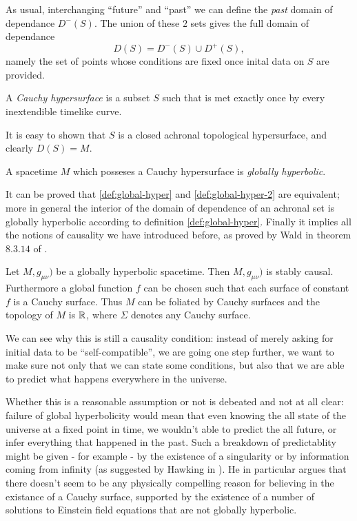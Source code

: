 As usual, interchanging ``future'' and ``past'' we can define the \emph{past} domain of dependance \(D^-(S)\). The union of these \(2\) sets gives the full domain of dependance 
\[
	D(S) = D^-(S) \cup D^+(S),
\]
namely the set of points whose conditions are fixed once inital data on \(S\) are provided.
\begin{definition}
	A \emph{Cauchy hypersurface} is a subset \(S\) such that is met exactly once by every inextendible timelike curve.
\end{definition}
It is easy to shown that \(S\) is a closed achronal topological hypersurface, and clearly \(D(S) = M\).
\begin{definition}
	\label{def:global-hyper-2}
	A spacetime \(M\) which posseses a Cauchy hypersurface is \emph{globally hyperbolic}.
\end{definition}
It can be proved that \ref{def:global-hyper} and \ref{def:global-hyper-2} are equivalent; more in general the interior of the domain of dependence of an achronal set is globally hyperbolic according to definition \ref{def:global-hyper}. Finally it implies all the notions of causality we have introduced before, as proved by Wald in theorem \(8.3.14\) of \cite{wald2010general} .
\begin{theorem}
	Let \(M,g_{\mu\nu})\) be a globally hyperbolic spacetime. Then \(M,g_{\mu\nu})\) is stably causal. Furthermore a global function \(f\) can be chosen such that each surface of constant \(f\) is a Cauchy surface. Thus \(M\) can be foliated by Cauchy surfaces and the topology of \(M\) is \(\R \time\Sigma\), where \(\Sigma\) denotes any Cauchy surface.
\end{theorem}

We can see why this is still a causality condition: instead of merely asking for initial data to be ``self-compatible'', we are going one step further, we want to make sure not only that we can state some conditions, but also that we are able to predict what happens everywhere in the universe. 

Whether this is a reasonable assumption or not is debeated and not at all clear: failure of global hyperbolicity would mean that even knowing the all state of the universe at a fixed point in time, we wouldn't able to predict the all future, or infer everything that happened in the past. Such a breakdown of predictablity might be given - for example - by the existence of a singularity or by information coming from infinity (as suggested by Hawking in \cite{hawking1973large}). He in particular argues that there doesn't seem to be any physically compelling reason for believing in the existance of a Cauchy surface, supported by the existence of a number of solutions to Einstein field equations that are not globally hyperbolic.

